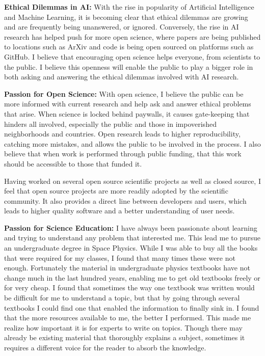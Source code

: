 \documentclass[12pt]{article}
\begin{document}
\textbf{Ethical Dilemmas in AI: }With the rise in popularity of Artificial
Intelligence and Machine Learning, it is becoming clear that ethical dilemmas
are growing and are frequently being unanswered, or ignored. Conversely, the
rise in AI research has helped push for more open science, where papers are
being published to locations such as ArXiv and code is being open sourced on
platforms such as GitHub. I believe that encouraging open science helps
everyone, from scientists to the public. I believe this openness will enable the
public to play a bigger role in both asking and answering the ethical dilemmas
involved with AI research. 


\textbf{Passion for Open Science: }With open science, I believe the public can
be more informed with current research and help ask and answer ethical problems
that arise. When science is locked behind paywalls, it causes gate-keeping that
hinders all involved, especially the public and those in impoverished
neighborhoods and countries. Open research leads to higher reproducibility,
catching more mistakes, and allows the public to be involved in the process. I
also believe that when work is performed through public funding, that this work
should be accessible to those that funded it.

Having worked on several open source scientific projects as well as closed
source, I feel that open source projects are more readily adopted
by the scientific community. It also provides a direct line between developers and
users, which leads to higher quality software and a better understanding of
user needs. 

\textbf{Passion for Science Education: }I have always been passionate about
learning and trying to understand any problem that interested me. This lead me
to pursue an undergraduate degree in Space Physics. While I was able to buy all
the books that were required for my classes, I found that many times these were
not enough. Fortunately the material in undergraduate physics textbooks have not
change much in the last hundred years, enabling me to get old textbooks freely
or for very cheap. I found that sometimes the way one textbook was written would
be difficult for me to understand a topic, but that by going through several
textbooks I could find one that enabled the information to finally sink in. I
found that the more resources available to me, the better I performed. This made
me realize how important it is for experts to write on topics. Though there may
already be existing material that thoroughly explains a subject, sometimes it
requires a different voice for the reader to absorb the knowledge.
\end{document}
